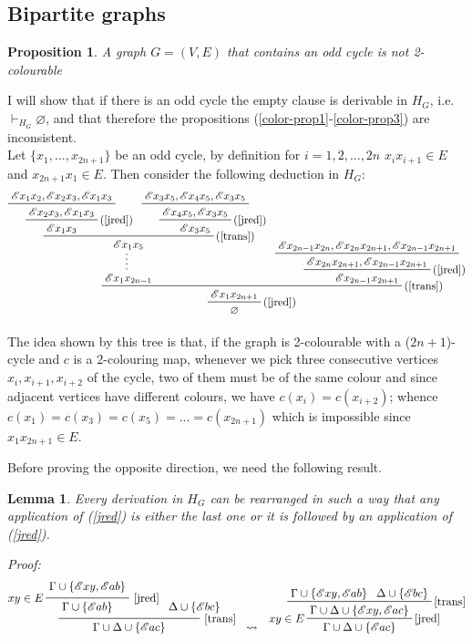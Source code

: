 \documentclass[a4paper,12pt,twoside]{book}
\newtheorem{proposition}[theorem]{Proposition}
\newtheorem{lemma}[theorem]{Lemma}
\newcommand{\E}{\mathscr{E}}
\let\emptyset\varnothing
\begin{document}
\subsection*{Bipartite graphs}

\begin{proposition}
A graph $G=(V,E)$ that contains an odd cycle is not 2-colourable 
\end{proposition}
I will show that if there is an odd cycle the empty clause is derivable in $H_G$, i.e. $\vdash_{H_G} \emptyset$, and that therefore the propositions 	(\ref{color-prop1}-\ref{color-prop3}) are inconsistent.\\
Let $\{x_1, ..., x_{2n+1}\} $ be an odd cycle, by definition for $i=1,2,..., 2n$ $x_i x_{i+1} \in E$ and $ x_{2n+1} x_1 \in E$. Then consider the following deduction in $H_G$:
$$\prftree[r]{(\ref{trans})}
{
\prfsummary{ 
\prftree[r]{(\ref{trans})}
{\prftree[r]{(\ref{jred})}{
\prftree {\E x_1 x_2 , \E x_2 x_3 , \E x_1 x_3 }
{\E x_2 x_3 , \E x_1 x_3  }
}
{\E x_1 x_3}}
{ \prftree[r]{(\ref{jred})}
{ \prftree{ \E x_3 x_5 , \E x_4 x_5 , \E x_3 x_5}
{\E x_4 x_5 , \E x_3 x_5}
}
{\E x_3 x_5}}
{\E x_1 x_5}
}
{\E x_1 x_{2n-1}}
}
{
\prftree[r]{(\ref{jred})}{ \prftree{\E x_{2n-1} x_{2n},\E x_{2n} x_{2n+1},\E x_{2n-1} x_{2n+1} }{\E x_{2n} x_{2n+1},\E x_{2n-1} x_{2n+1}} }
{\E x_{2n-1} x_{2n+1}}
}
{\prftree[r]{(\ref{jred})}{\E x_1 x_{2n+1}}{\emptyset}} 
$$

The idea shown by this tree is that, if the graph is 2-colourable with a ($2n+1$)-cycle and $c$ is a 2-colouring map, whenever we pick three consecutive vertices $x_i,x_{i+1},x_{i+2}$ of the cycle, two of them must be of the same colour and since adjacent vertices have different colours, we have $c(x_i)=c(x_{i+2})$; whence $c(x_1)=c(x_3)=c(x_5)=...=c(x_{2n+1})$ which is impossible since $x_1x_{2n+1} \in E$.

\newpage
Before proving the opposite direction, we need the following result.
\begin{lemma}\label{lemma_rules}
Every derivation in $H_G$ can be rearranged in such a way that any application of (\ref{jred}) is either the last one or it is followed by an application of (\ref{jred}).
\end{lemma}
\emph{Proof:}
\begin{eqnarray*}
\prfrulenameskip=0.4em\prflinepadbefore=1ex
\prftree[r]{\ref{trans}} 
{\prftree[l,r]{\ref{jred}}{$xy \in E$}{\Gamma \cup \{\E xy ,\E ab \}}{\Gamma \cup \{\E ab \}}}
{\Delta \cup \{\E bc \} \hspace{0.7cm}}
{\Gamma \cup \Delta \cup \{\E ac \}}
& \leadsto
&\prftree[l,r]{\ref{jred}}{$xy \in E$} 
{\prftree[r]{\ref{trans}}
{\Gamma \cup \{\E xy ,\E ab \}}{\Delta \cup \{\E bc \}}
{\Gamma\cup\Delta \cup \{\E xy , \E ac \} }}
{\Gamma \cup \Delta \cup \{\E ac \}}
 \end{eqnarray*}
\end{document}
